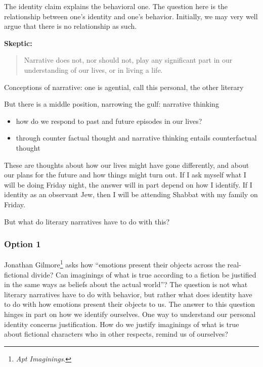\documentclass[phdthesis,12pt,final,a4paper]{wuthesis}
\theoremstyle{definition}
\theoremstyle{definition}
\theoremstyle{definition}
\theoremstyle{definition}
\theoremstyle{remark}
\begin{document}
The identity claim explains the behavioral one. The question here is the relationship between one's identity and one's behavior. Initially, we may very well argue that there is no relationship as such.

\textbf{Skeptic:}

\begin{quote}
Narrative does not, nor should not, play any significant part in our understanding of our lives, or in living a life.
\end{quote}

Conceptions of narrative: one is agential, call this personal, the other literary

But there is a middle position, narrowing the gulf: narrative thinking

\begin{itemize}
\item
  how do we respond to past and future episodes in our lives?
\item
  through counter factual thought and narrative thinking entails counterfactual thought
\end{itemize}

These are thoughts about how our lives might have gone differently, and about our plans for the future and how things might turn out. If I ask myself what I will be doing Friday night, the answer will in part depend on how I identify. If I identity as an observant Jew, then I will be attending Shabbat with my family on Friday.

But what do literary narratives have to do with this?

\subsubsection*{Option 1}\label{option-1}

Jonathan Gilmore\footnote{\emph{Apt {Imaginings}}.} asks how ``emotions present their objects across the real-fictional divide? Can imaginings of what is true according to a fiction be justified in the same ways as beliefs about the actual world''? The question is not what literary narratives have to do with behavior, but rather what does identity have to do with how emotions present their objects to us. The answer to this question hinges in part on how we identify ourselves. One way to understand our personal identity concerns justification. How do we justify imaginings of what is true about fictional characters who in other respects, remind us of ourselves?
\end{document}
